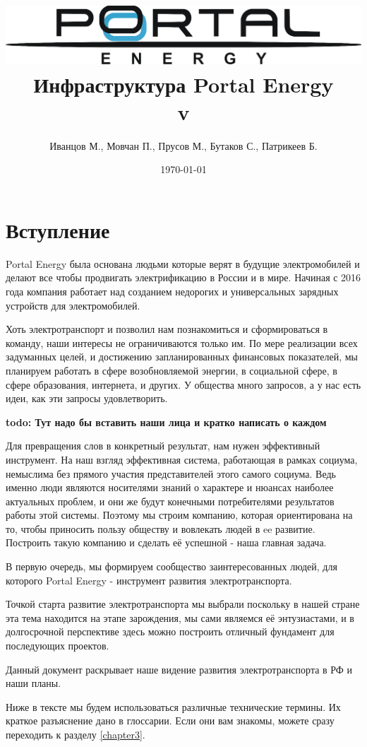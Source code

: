 \documentclass[a4paper,12pt]{report}
\title{\includegraphics[width=14cm]{logo}\\[2cm]Инфраструктура Portal Energy \\\normalsize v\versionnumber}
\author{Иванцов М., Мовчан П., Прусов М., Бутаков С., Патрикеев Б.}
\date{\today}
\begin{document}
%
\maketitle
\tableofcontents
\clearpage


\chapter{Вступление}

Portal Energy была основана людьми которые верят в будущие электромобилей и делают все чтобы продвигать электрификацию в России и в мире. Начиная с 2016 года компания работает над созданием недорогих и универсальных зарядных устройств для электромобилей. 

Хоть электротранспорт и позволил нам познакомиться и сформироваться в команду, наши интересы не ограничиваются только им. По мере реализации всех задуманных целей, и достижению запланированных финансовых показателей, мы планируем работать в сфере возобновляемой энергии, в социальной сфере, в сфере образования, интернета, и других. У общества много запросов, а у нас есть идеи, как эти запросы удовлетворить. 

\textbf{todo: Тут надо бы вставить наши лица и кратко написать о каждом}

Для превращения слов в конкретный результат, нам нужен эффективный инструмент. На наш взгляд эффективная система, работающая в рамках социума, немыслима без прямого участия представителей этого самого социума. Ведь именно люди являются носителями знаний о характере и нюансах наиболее актуальных проблем, и они же будут конечными потребителями результатов работы этой системы. Поэтому мы строим компанию, которая ориентирована на то, чтобы приносить пользу обществу и вовлекать людей в ee развитие. Построить такую компанию и сделать её успешной - наша главная задача. 

В первую очередь, мы формируем сообщество заинтересованных людей, для которого Portal Energy -  инструмент развития электротранспорта.

Точкой старта развитие электротранспорта мы выбрали поскольку в нашей стране эта тема находится на этапе зарождения, мы сами являемся её энтузиастами, и в долгосрочной перспективе здесь можно построить отличный фундамент для последующих проектов. 

Данный документ раскрывает наше видение развития электротранспорта в РФ и наши планы.

Ниже в тексте мы будем использоваться различные технические термины. Их краткое разъяснение дано в глоссарии. Если они вам знакомы, можете сразу переходить к разделу \ref{chapter3}.
\end{document}
